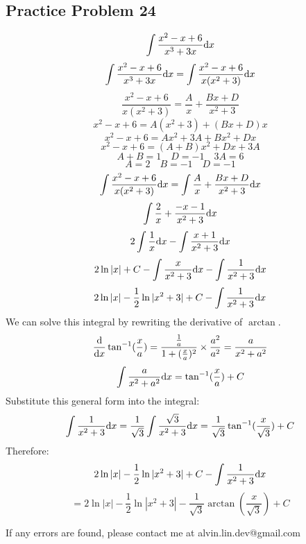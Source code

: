 \documentclass[letterpaper, 12pt]{math}
\begin{document}
\subsection*{Practice Problem 24}
\[ \int{\frac{x^{2}-x+6}{x^{3}+3x}\mathrm{d}{x}} \]
\[ \int{\frac{x^{2}-x+6}{x^{3}+3x}\mathrm{d}{x}} =
   \int{\frac{x^{2}-x+6}{x(x^{2}+3)}\mathrm{d}{x}} \]
\[ \frac{x^{2}-x+6}{x(x^{2}+3)} = \frac{A}{x}+\frac{Bx+D}{x^{2}+3} \]
\[ x^{2}-x+6 = A(x^{2}+3)+(Bx+D)x \]
\[ x^{2}-x+6 = Ax^{2}+3A+Bx^{2}+Dx \]
\[ x^{2}-x+6 = (A+B)x^{2}+Dx+3A \]
\[ A+B = 1 \quad D = -1 \quad 3A = 6 \]
\[ A = 2 \quad B = -1 \quad D = -1 \]
\[ \int{\frac{x^{2}-x+6}{x(x^{2}+3)}\mathrm{d}{x}} =
   \int{\frac{A}{x}+\frac{Bx+D}{x^{2}+3}\mathrm{d}{x}} \]
\[ \int{\frac{2}{x}+\frac{-x-1}{x^{2}+3}\mathrm{d}{x}} \]
\[ 2\int{\frac{1}{x}\mathrm{d}{x}}-\int{\frac{x+1}{x^{2}+3}\mathrm{d}{x}} \]
\[ 2\ln|x|+C-\int{\frac{x}{x^{2}+3}\mathrm{d}{x}}-\int{\frac{1}{x^{2}+3}\mathrm{d}{x}} \]
\[ 2\ln|x|-\frac{1}{2}\ln|x^{2}+3|+C-\int{\frac{1}{x^{2}+3}\mathrm{d}{x}} \]
We can solve this integral by rewriting the derivative of \( \arctan \).
\[ \frac{\mathrm{d}}{\mathrm{d}{x}}\tan^{-1}(\frac{x}{a}) =
   \frac{\frac{1}{a}}{1+(\frac{x}{a})^{2}}\times\frac{a^{2}}{a^{2}} =
   \frac{a}{x^{2}+a^{2}} \]
\[ \int{\frac{a}{x^{2}+a^{2}}\mathrm{d}{x}} = \tan^{-1}(\frac{x}{a})+C \]
Substitute this general form into the integral:
\[ \int{\frac{1}{x^{2}+3}\mathrm{d}{x}} =
   \frac{1}{\sqrt{3}}\int{\frac{\sqrt{3}}{x^{2}+3}\mathrm{d}{x}} =
   \frac{1}{\sqrt{3}}\tan^{-1}(\frac{x}{\sqrt{3}})+C \]
Therefore:
\[ 2\ln|x|-\frac{1}{2}\ln|x^{2}+3|+C-\int{\frac{1}{x^{2}+3}\mathrm{d}{x}} \]
\[ = 2\ln|x|-\frac{1}{2}\ln|x^{2}+3|-
   \frac{1}{\sqrt{3}}\arctan(\frac{x}{\sqrt{3}})+C \]

\begin{center}
  If any errors are found, please contact me at alvin.lin.dev@gmail.com
\end{center}
\end{document}
